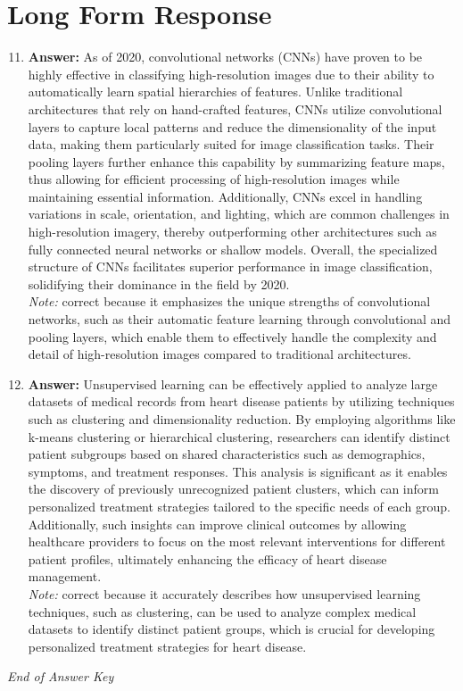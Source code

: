 \documentclass[12pt]{article}
\begin{document}
\section*{Long Form Response}
\begin{enumerate}[label=\arabic*.]
\setcounter{enumi}{10}
\item \textbf{Answer:} As of 2020, convolutional networks (CNNs) have proven to be highly effective in classifying high-resolution images due to their ability to automatically learn spatial hierarchies of features. Unlike traditional architectures that rely on hand-crafted features, CNNs utilize convolutional layers to capture local patterns and reduce the dimensionality of the input data, making them particularly suited for image classification tasks. Their pooling layers further enhance this capability by summarizing feature maps, thus allowing for efficient processing of high-resolution images while maintaining essential information. Additionally, CNNs excel in handling variations in scale, orientation, and lighting, which are common challenges in high-resolution imagery, thereby outperforming other architectures such as fully connected neural networks or shallow models. Overall, the specialized structure of CNNs facilitates superior performance in image classification, solidifying their dominance in the field by 2020.
\\ \textit{Note:} correct because it emphasizes the unique strengths of convolutional networks, such as their automatic feature learning through convolutional and pooling layers, which enable them to effectively handle the complexity and detail of high-resolution images compared to traditional architectures.
\item \textbf{Answer:} Unsupervised learning can be effectively applied to analyze large datasets of medical records from heart disease patients by utilizing techniques such as clustering and dimensionality reduction. By employing algorithms like k-means clustering or hierarchical clustering, researchers can identify distinct patient subgroups based on shared characteristics such as demographics, symptoms, and treatment responses. This analysis is significant as it enables the discovery of previously unrecognized patient clusters, which can inform personalized treatment strategies tailored to the specific needs of each group. Additionally, such insights can improve clinical outcomes by allowing healthcare providers to focus on the most relevant interventions for different patient profiles, ultimately enhancing the efficacy of heart disease management.
\\ \textit{Note:} correct because it accurately describes how unsupervised learning techniques, such as clustering, can be used to analyze complex medical datasets to identify distinct patient groups, which is crucial for developing personalized treatment strategies for heart disease.
\end{enumerate}

\vfill
\noindent\textit{End of Answer Key}
\end{document}
